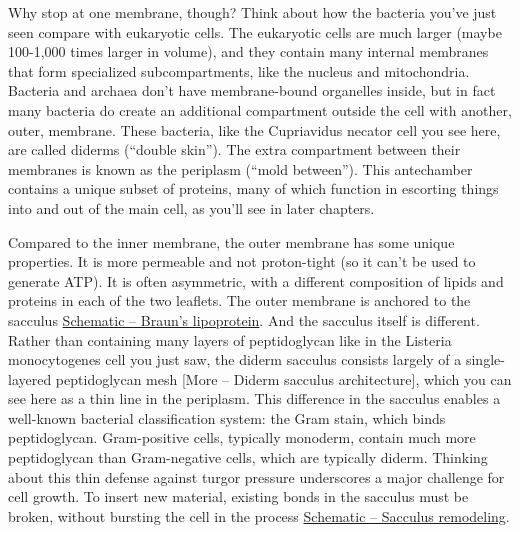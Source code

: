 \documentclass[]{tufte-book}
\begin{document}
Why stop at one membrane, though? Think about how the bacteria you've
just seen compare with eukaryotic cells. The eukaryotic cells are much
larger (maybe 100-1,000 times larger in volume), and they contain many
internal membranes that form specialized subcompartments, like the
nucleus and mitochondria. Bacteria and archaea don't have membrane-bound
organelles inside, but in fact many bacteria do create an additional
compartment outside the cell with another, outer, membrane. These
bacteria, like the Cupriavidus necator cell you see here, are called
diderms (``double skin''). The extra compartment between their membranes
is known as the periplasm (``mold between''). This antechamber contains
a unique subset of proteins, many of which function in escorting things
into and out of the main cell, as you'll see in later chapters.

Compared to the inner membrane, the outer membrane has some unique
properties. It is more permeable and not proton-tight (so it can't be
used to generate ATP). It is often asymmetric, with a different
composition of lipids and proteins in each of the two leaflets. The
outer membrane is anchored to the sacculus
\protect\hyperlink{fig:2-3-1}{Schematic -- Braun's lipoprotein}. And the
sacculus itself is different. Rather than containing many layers of
peptidoglycan like in the Listeria monocytogenes cell you just saw, the
diderm sacculus consists largely of a single-layered peptidoglycan mesh
{[}More -- Diderm sacculus architecture{]}, which you can see here as a
thin line in the periplasm. This difference in the sacculus enables a
well-known bacterial classification system: the Gram stain, which binds
peptidoglycan. Gram-positive cells, typically monoderm, contain much
more peptidoglycan than Gram-negative cells, which are typically diderm.
Thinking about this thin defense against turgor pressure underscores a
major challenge for cell growth. To insert new material, existing bonds
in the sacculus must be broken, without bursting the cell in the process
\protect\hyperlink{fig:2-3-2}{Schematic -- Sacculus remodeling}.
\end{document}

